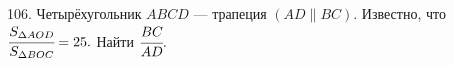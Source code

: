 106. Четырёхугольник $ABCD$ --- трапеция $(AD\parallel BC).$ Известно, что $\cfrac{S_{\Delta AOD}}{S_{\Delta BOC}}=25.$ Найти $\cfrac{BC}{AD}.$\\
